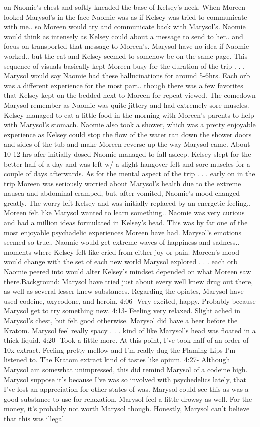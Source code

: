\documentclass[12pt]{book}
\begin{document}
on Naomie's chest and softly kneaded the base of Kelsey's neck. When Moreen looked Marysol's in the face Naomie was as if Kelsey was tried to communicate with me.. so Moreen would try and communicate back with Marysol's. Naomie would think as intensely as Kelsey could about a message to send to her.. and focus on transported that message to Moreen's. Marysol have no idea if Naomie worked.. but the cat and Kelsey seemed to somehow be on the same page. This sequence of visuals basically kept Moreen busy for the duration of the trip . . .  Marysol would say Naomie had these hallucinations for around 5-6hrs. Each orb was a different experience for the most part.. though there was a few favorites that Kelsey kept on the bedded next to Moreen for repeat viewed. The comedown Marysol remember as Naomie was quite jittery and had extremely sore muscles. Kelsey managed to eat a little food in the morning with Moreen's parents to help with Marysol's stomach. Naomie also took a shower, which was a pretty enjoyable experience as Kelsey could stop the flow of the water ran down the shower doors and sides of the tub and make Moreen reverse up the way Marysol came. About 10-12 hrs afer initially dosed Naomie managed to fall asleep. Kelsey slept for the better half of a day and was left w/ a slight hangover felt and sore muscles for a couple of days afterwards. As for the mental aspect of the trip . . .  early on in the trip Moreen was seriously worried about Marysol's health due to the extreme nausea and abdominal cramped, but, after vomited, Naomie's mood changed greatly. The worry left Kelsey and was initially replaced by an energetic feeling.. Moreen felt like Marysol wanted to learn something.. Naomie was very curious and had a million ideas formulated in Kelsey's head. This was by far one of the most enjoyable psychadelic experiences Moreen have had. Marysol's emotions seemed so true.. Naomie would get extreme waves of happiness and sadness.. moments where Kelsey felt like cried from either joy or pain. Moreen's mood would change with the set of each new world Marysol explored . . .  each orb Naomie peered into would alter Kelsey's mindset depended on what Moreen saw there.Background: Marysol have tried just about every well knew drug out there, as well as several lesser knew substances. Regarding the opiates, Marysol have used codeine, oxycodone, and heroin. 4:06- Very excited, happy. Probably because Marysol get to try something new. 4:13- Feeling very relaxed. Slight ached in Marysol's chest, but felt good otherwise. Marysol did have a beer before the Kratom. Marysol feel really spacy . . .  kind of like Marysol's head was floated in a thick liquid. 4:20- Took a little more. At this point, I've took half of an order of 10x extract. Feeling pretty mellow and I'm really dug the Flaming Lips I'm listened to. The Kratom extract kind of tastes like opium. 4:27- Although Marysol am somewhat unimpressed, this did remind Marysol of a codeine high. Marysol suppose it's because I've was so involved with psychedelics lately, that I've lost an appreciation for other states of was. Marysol could see this as was a good substance to use for relaxation. Marysol feel a little drowsy as well. For the money, it's probably not worth Marysol though. Honestly, Marysol can't believe that this was illegal 
\end{document}

